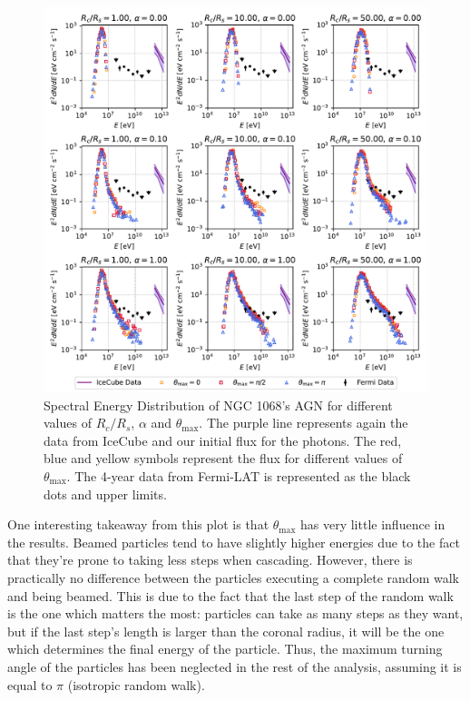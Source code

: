 \begin{figure}[H]
    \includegraphics[width=\textwidth]{Figures/simulations_plot.pdf}
    \centering
    \caption{Spectral Energy Distribution of NGC 1068's AGN for different values of $R_c/R_s$, $\alpha$ and $\theta_{\max}$. The purple line represents again the data from IceCube and our initial flux for the photons. The red, blue and yellow symbols represent the flux for different values of $\theta_{\max}$. The 4-year data from Fermi-LAT is represented as the black dots and upper limits.}
    \label{fig:simulations}
\end{figure}

One interesting takeaway from this plot is that $\theta_{\max}$ has very little influence in the results. Beamed particles tend to have slightly higher energies due to the fact that they're prone to taking less steps when cascading. However, there is practically no difference between the particles executing a complete random walk and being beamed. This is due to the fact that the last step of the random walk is the one which matters the most: particles can take as many steps as they want, but if the last step's length is larger than the coronal radius, it will be the one which determines the final energy of the particle. Thus, the maximum turning angle of the particles has been neglected in the rest of the analysis, assuming it is equal to $\pi$ (isotropic random walk).


